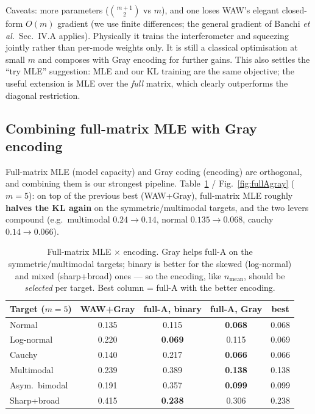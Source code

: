 \documentclass[11pt,a4paper]{article}
\begin{document}
Caveats: more parameters ($\binom{m+1}{2}$ vs $m$), and one loses WAW's elegant
closed-form $O(m)$ gradient (we use finite differences; the general gradient of
Banchi \textit{et al.}\ Sec.~IV.A applies). Physically it trains the
interferometer and squeezing jointly rather than per-mode weights only. It is
still a classical optimisation at small $m$ and composes with Gray encoding for
further gains. This also settles the ``try MLE'' suggestion: MLE and our KL
training are the same objective; the useful extension is MLE over the \emph{full}
matrix, which clearly outperforms the diagonal restriction.

\subsection{Combining full-matrix MLE with Gray encoding}
\label{sec:fullAgray}
Full-matrix MLE (model capacity) and Gray coding (encoding) are orthogonal, and
combining them is our strongest pipeline. Table~\ref{tab:fullAgray} /
Fig.~\ref{fig:fullAgray} ($m=5$): on top of the previous best (WAW+Gray),
full-matrix MLE roughly \textbf{halves the KL again} on the symmetric/multimodal
targets, and the two levers compound (e.g.\ multimodal $0.24\to0.14$, normal
$0.135\to0.068$, cauchy $0.14\to0.066$).

\begin{table}[h]
\centering
\begin{tabular}{lcccc}
\toprule
Target ($m{=}5$) & WAW+Gray & full-A, binary & full-A, Gray & best\\
\midrule
Normal           & 0.135 & 0.115 & \textbf{0.068} & 0.068\\
Log-normal       & 0.220 & \textbf{0.069} & 0.115 & 0.069\\
Cauchy           & 0.140 & 0.217 & \textbf{0.066} & 0.066\\
Multimodal       & 0.239 & 0.389 & \textbf{0.138} & 0.138\\
Asym.\ bimodal   & 0.191 & 0.357 & \textbf{0.099} & 0.099\\
Sharp+broad      & 0.415 & \textbf{0.238} & 0.306 & 0.238\\
\bottomrule
\end{tabular}
\caption{Full-matrix MLE $\times$ encoding. Gray helps full-A on the
symmetric/multimodal targets; binary is better for the skewed (log-normal) and
mixed (sharp+broad) ones --- so the encoding, like $n_{\mathrm{mean}}$, should be
\emph{selected} per target. Best column = full-A with the better encoding.}
\label{tab:fullAgray}
\end{table}
\end{document}
